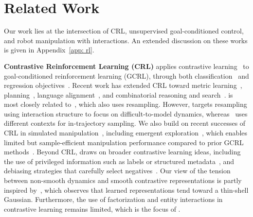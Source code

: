 \section{Related Work}
Our work lies at the intersection of CRL, unsupervised goal-conditioned control, and robot manipulation with interactions. An extended discussion on these works is given in Appendix~\ref{app: rl}.

\textbf{Contrastive Reinforcement Learning (CRL)} applies contrastive learning~\citep{oord2018representation} to goal-conditioned reinforcement learning (GCRL), through both classification~\citep{eysenbach2021clearning} and regression  objectives~\citep{eysenbach2022contrastive}. Recent work has extended CRL toward metric learning~\citep{zheng2025multistep,myers2026offline}, planning~\citep{eysenbach2024inference}, language alignment~\citep{myers2023goal,myers2026temporal}, and combinatorial reasoning and search~\citep{wang2026temporal,ziarko2026contrastive}. \methodname{} is most closely related to~\citet{ziarko2026contrastive}, which also uses resampling. However, \methodshort{} targets resampling using interaction structure to focus on difficult-to-model dynamics, whereas~\citet{ziarko2026contrastive} uses different contexts for in-trajectory sampling.
We also build on recent successes of CRL in simulated manipulation~\citep{wang20261000}, including emergent exploration~\citep{liu2025single,bastankhah2026demystifying}, which enables limited but sample-efficient manipulation performance compared to prior GCRL methods~\citep{puterman1990markov,kaelbling1993learning,liu2022goal,andrychowicz2017hindsight,bai2021addressing}. Beyond CRL, \methodshort{} draws on broader contrastive learning ideas, including the use of privileged information such as labels or structured metadata~\citep{feng2022adaptive,denize2023similarity,khosla2020supervised,hoffmann2022ranking}, and debiasing strategies that carefully select negatives~\citep{chuang2020debiased,huynh2022boosting,dwibedi2021little}. Our view of the tension between non-smooth dynamics and smooth contrastive representations is partly inspired by~\citet{betser2026infonce}, which observes that learned representations tend toward a thin-shell Gaussian. Furthermore, the use of factorization and entity interactions in contrastive learning remains limited, which is the focus of \methodshort{}.

